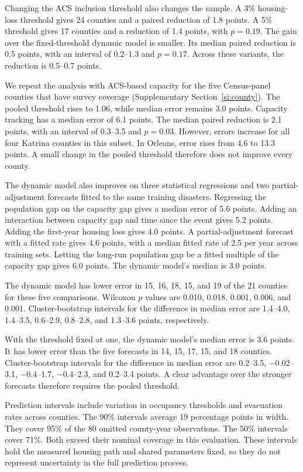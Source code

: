 \documentclass[11pt]{article}
\begin{document}
Changing the ACS inclusion threshold also changes the sample. A 3\% housing-loss threshold gives 24 counties and a paired reduction of 1.8 points. A 5\% threshold gives 17 counties and a reduction of 1.4 points, with $p=0.19$. The gain over the fixed-threshold dynamic model is smaller. Its median paired reduction is 0.5 points, with an interval of 0.2--1.3 and $p=0.17$. Across these variants, the reduction is 0.5--0.7 points.

We repeat the analysis with ACS-based capacity for the five Census-panel counties that have survey coverage (Supplementary Section~\ref{si:county}). The pooled threshold rises to 1.06, while median error remains 3.0 points. Capacity tracking has a median error of 6.1 points. The median paired reduction is 2.1 points, with an interval of 0.3--3.5 and $p=0.03$. However, errors increase for all four Katrina counties in this subset. In Orleans, error rises from 4.6 to 13.3 points. A small change in the pooled threshold therefore does not improve every county.

The dynamic model also improves on three statistical regressions and two partial-adjustment forecasts fitted to the same training disasters. Regressing the population gap on the capacity gap gives a median error of 5.6 points. Adding an interaction between capacity gap and time since the event gives 5.2 points. Adding the first-year housing loss gives 4.0 points. A partial-adjustment forecast with a fitted rate gives 4.6 points, with a median fitted rate of 2.5 per year across training sets. Letting the long-run population gap be a fitted multiple of the capacity gap gives 6.0 points. The dynamic model's median is 3.0 points.

The dynamic model has lower error in 15, 16, 18, 15, and 19 of the 21 counties for these five comparisons. Wilcoxon $p$ values are 0.010, 0.018, 0.001, 0.006, and 0.001. Cluster-bootstrap intervals for the difference in median error are 1.4--4.0, 1.4--3.5, 0.6--2.9, 0.8--2.8, and 1.3--3.6 points, respectively.

With the threshold fixed at one, the dynamic model's median error is 3.6 points. It has lower error than the five forecasts in 14, 15, 17, 15, and 18 counties. Cluster-bootstrap intervals for the difference in median error are 0.2--3.5, $-0.02$--3.1, $-0.4$--1.7, $-0.4$--2.3, and 0.2--3.4 points. A clear advantage over the stronger forecasts therefore requires the pooled threshold.

Prediction intervals include variation in occupancy thresholds and evacuation rates across counties. The 90\% intervals average 19 percentage points in width. They cover 95\% of the 80 omitted county-year observations. The 50\% intervals cover 71\%. Both exceed their nominal coverage in this evaluation. These intervals hold the measured housing path and shared parameters fixed, so they do not represent uncertainty in the full prediction process.
\end{document}
